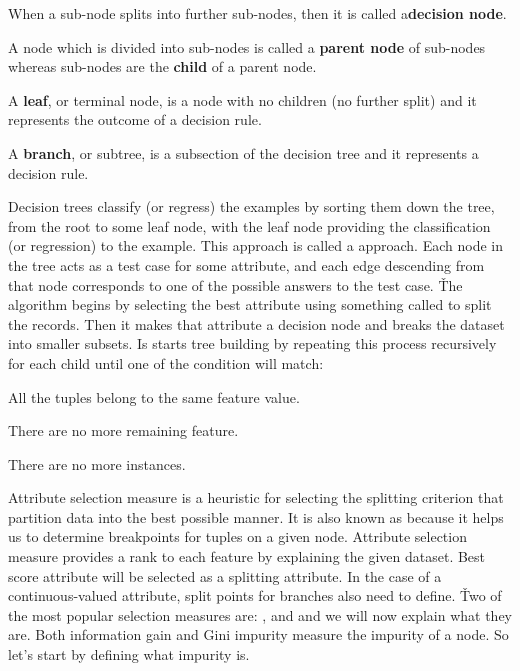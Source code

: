 When a sub-node splits into further sub-nodes, then it is called a\textbf{decision node}.
\ed

A node which is divided into sub-nodes is called a \textbf{parent node} of sub-nodes whereas sub-nodes are the
\textbf{child} of a parent node.
\ed

\bd [Leaf]
A \textbf{leaf}, or terminal node, is a node with no children (no further split) and it represents the outcome of a
decision rule.
\ed

\bd [Branch]
A \textbf{branch}, or subtree, is a subsection of the decision tree and it represents a decision rule.
\ed

\vspace{-10pt}


Decision trees classify (or regress) the examples by sorting them down the tree, from the root to some leaf node,
with the leaf node providing the classification (or regression) to the example. This approach is called a
 approach. Each node in the tree acts as a test case for some attribute, and each edge descending from
that node corresponds to one of the possible answers to the test case. \v

The algorithm begins by selecting the best attribute using something called  to
split the records. Then it makes that attribute a decision node and breaks the dataset into smaller subsets. Is
starts tree building by repeating this process recursively for each child until one of the condition will match:
\bit
\item All the tuples belong to the same feature value.
\item There are no more remaining feature.
\item There are no more instances.
\eit

Attribute selection measure is a heuristic for selecting the splitting criterion that partition data into the best
possible manner. It is also known as  because it helps us to determine breakpoints for tuples on
a given node. Attribute selection measure provides a rank to each feature by explaining the given dataset. Best score
attribute will be selected as a splitting attribute. In the case of a continuous-valued attribute, split points for
branches also need to define. \v

Two of the most popular selection measures are: , and  and we will now
explain what they are. Both information gain and Gini impurity measure the impurity of a node. So let's start by
defining what impurity is.

